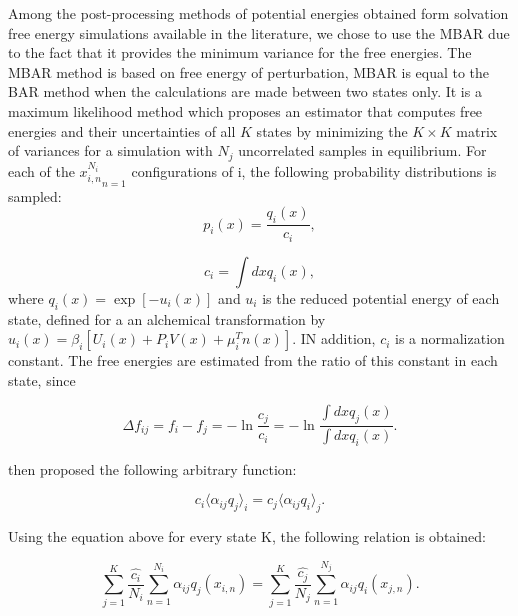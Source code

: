 	Among the post-processing methods of potential energies obtained form solvation free energy simulations available in the literature, we chose to use the MBAR due to the fact that it provides the minimum variance for the free energies. The MBAR method \cite{mbar} is based on free energy of perturbation, MBAR is equal to the BAR method when the calculations are made between two states only. It is a maximum likelihood method which proposes an estimator that computes free energies and their uncertainties of all $K$ states  by minimizing the $K \times K$ matrix of variances for a simulation with $N_{j}$ uncorrelated samples in equilibrium. For each of the ${x^{N_{i}}_{i,n }}_{n=1 }$ configurations of i, the following probability distributions is sampled:
	\begin{equation}
	p_{i}(x) = \frac{q_{i}(x)}{c_{i}},
	\end{equation}
	
	\begin{equation}
	c_{i} = \int dx q_{i}(x),
	\end{equation}
	where $q_{i}(x)=\exp[-u_{i}(x)]$ and $u_{i}$ is the reduced potential energy of each state, defined for a an alchemical transformation by $u_{i} (x)= \beta_{i} [U_{i}(x)+P_{i}V(x) + \mu _{i}^{T}n(x)]$. IN addition, $c_{i}$ is a normalization constant.  The free energies are estimated from the ratio of this constant in each state, since
	
	\begin{equation}
	\Delta f_{ij} = f_{i} - f_{j} = - \ln \frac{c_{j}}{c_{i}}  = -\ln \frac{\int dx q_{j}(x)}{\int dx q_{i}(x)} .
	\label{eqn:mbar1}
	\end{equation}
	
	 then proposed the following arbitrary function:
	
	\begin{equation}
	c_{i} \langle \alpha _{ij} q_{j} \rangle _{i}  =  c_{j} \langle \alpha _{ij} q_{i} \rangle _{j} .
	\end{equation}
	
	Using the equation above for every state  K, the following relation is obtained:
	
	\begin{equation}
	\label{eq:mbar1}
	\sum_{j=1}^{K} \frac{\hat{c_{i}}}{N_{i}} \sum_{n=1}^{N_{i}} \alpha _{ij} q_{j} (x_{i,n}) =  \sum_{j=1}^{K} \frac{\hat{c_{j}}}{N_{j}} \sum_{n=1}^{N_{j}} \alpha _{ij} q_{i} (x_{j,n}) .
	\end{equation}
	
